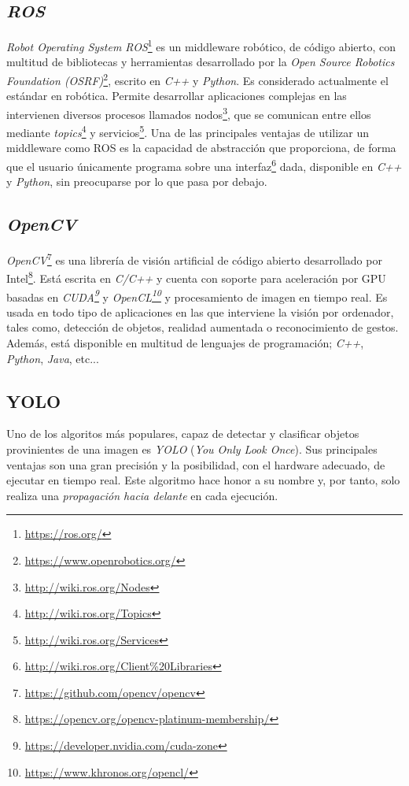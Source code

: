 \subsection{\textit{ROS}}
\label{subsection:ros}
\textit{Robot Operating System ROS}\footnote{\url{https://ros.org/}} es un middleware robótico, de código abierto, con multitud de bibliotecas y herramientas desarrollado por la \textit{Open Source Robotics Foundation (OSRF)}\footnote{\url{https://www.openrobotics.org/}}, escrito en \textit{C++} y \textit{Python}. Es considerado actualmente el estándar en robótica. Permite desarrollar aplicaciones complejas en las intervienen diversos procesos llamados nodos\footnote{\url{http://wiki.ros.org/Nodes}}, que se comunican entre ellos mediante \textit{topics}\footnote{\url{http://wiki.ros.org/Topics}} y servicios\footnote{\url{http://wiki.ros.org/Services}}. Una de las principales ventajas de utilizar un middleware como ROS es la capacidad de abstracción que proporciona, de forma que el usuario únicamente programa sobre una interfaz\footnote{\url{http://wiki.ros.org/Client\%20Libraries}} dada, disponible en \textit{C++} y \textit{Python}, sin preocuparse por lo que pasa por debajo.\\

\subsection{\textit{OpenCV}}
\label{subsection:opencv}
\textit{OpenCV}\footnote{\url{https://github.com/opencv/opencv}} es una librería de visión artificial de código abierto desarrollado por Intel\footnote{\url{https://opencv.org/opencv-platinum-membership/}}. Está escrita en \textit{C/C++} y cuenta con soporte para aceleración por GPU basadas en \textit{CUDA\footnote{\url{https://developer.nvidia.com/cuda-zone}}} y \textit{OpenCL\footnote{\url{https://www.khronos.org/opencl/}}} y procesamiento de imagen en tiempo real. Es usada en todo tipo de aplicaciones en las que interviene la visión por ordenador, tales como, detección de objetos, realidad aumentada o reconocimiento de gestos. Además, está disponible en multitud de lenguajes de programación; \textit{C++}, \textit{Python}, \textit{Java}, etc...\\

\subsection{YOLO}
\label{sec:yolo}

Uno de los algoritos más populares, capaz de detectar y clasificar objetos provinientes de una imagen es \textit{YOLO} (\textit{You Only Look Once})\cite{yolov3}. Sus principales ventajas son una gran precisión y la posibilidad, con el hardware adecuado, de ejecutar en tiempo real. Este algoritmo hace honor a su nombre y, por tanto, solo realiza una \textit{propagación hacia delante} en cada ejecución.\\

